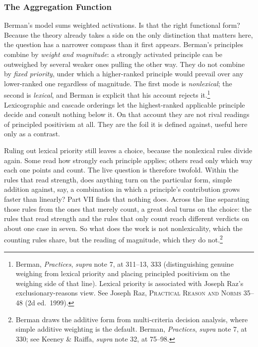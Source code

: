 \subsubsection{The Aggregation Function}

Berman's model sums weighted activations. Is that the right functional
form? Because the theory already takes a side on the only distinction that
matters here, the question has a narrower compass than it first appears.
Berman's principles combine by \textit{weight and magnitude}: a strongly
activated principle can be outweighed by several weaker ones pulling the
other way. They do not combine by \textit{fixed priority}, under which a
higher-ranked principle would prevail over any lower-ranked one regardless
of magnitude. The first mode is \textit{nonlexical}; the second is
\textit{lexical}, and Berman is explicit that his account rejects
it.\footnote{Berman, \textit{Practices}, \textit{supra} note 7, at
311--13, 333 (distinguishing genuine weighing from
lexical priority and placing principled positivism on the weighing side of
that line). Lexical priority is associated with Joseph Raz's
exclusionary-reasons view. See Joseph Raz, \textsc{Practical Reason and
Norms} 35--48 (2d ed.\ 1999).} Lexicographic and cascade orderings let the
highest-ranked applicable principle decide and consult nothing below it. On
that account they are not rival readings of principled positivism at all.
They are the foil it is defined against, useful here only as a contrast.

Ruling out lexical priority still leaves a choice, because the nonlexical
rules divide again. Some read how strongly each principle applies; others
read only which way each one points and count. The live question is
therefore twofold. Within the rules that read strength, does anything turn
on the particular form, simple addition against, say, a combination in
which a principle's contribution grows faster than linearly? Part VII finds
that nothing does. Across the line separating those rules from the ones
that merely count, a great deal turns on the choice: the rules that read
strength and the rules that only count reach different verdicts on about one
case in seven. So what does the work is not
nonlexicality, which the counting rules share, but the reading of
magnitude, which they do not.\footnote{Berman draws the additive form
from multi-criteria decision analysis, where simple additive weighting is
the default. Berman, \textit{Practices}, \textit{supra} note 7, at 330; see
Keeney \& Raiffa, \textit{supra} note 32, at 75--98.}

